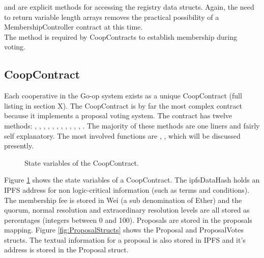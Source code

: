  and  are explicit methods for accessing the registry data structs. Again, the need to return variable length arrays removes the practical possibility of a MembershipController contract at this time. \\

The  method is required by CoopContracts to establish membership during voting.\\

\subsection{CoopContract}
Each cooperative in the Go-op system exists as a unique CoopContract (full listing in section X). The CoopContract is by far the most complex contract because it implements a proposal voting system. The  contract has twelve methods: , , , , , , , , , , , . The majority of these methods are one liners and fairly self explanatory. The most involved functions are , ,  which will be discussed presently.\\
\begin{figure}
\centering
{}
\decoRule
\caption[State Variables ofCoopContract]{State variables of the CoopContract.}
\label{fig:CoopState}
\end{figure}

Figure \ref{fig:CoopState} shows the state variables of a CoopContract. The ipfsDataHash holds an IPFS address for non logic-critical information (such as terms and conditions). The membership fee is stored in Wei (a sub denomination of Ether) and the quorum, normal resolution and extraordinary resolution levels are all stored as percentages (integers between 0 and 100). Proposals are stored in the proposals mapping. Figure \ref{fig:ProposalStructs} shows the Proposal and ProposalVotes structs. The textual information for a proposal is also stored in IPFS and it's address is stored in the Proposal struct.\\

